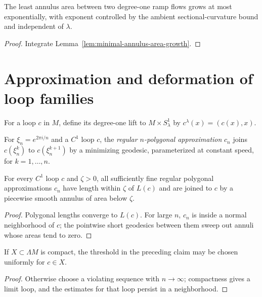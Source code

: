 \begin{corollary}
\label{cor:minimal-annulus-exponential-growth}

The least annulus area between two degree-one ramp flows grows at most
exponentially, with exponent controlled by the ambient sectional-curvature
bound and independent of $\lambda$.
\end{corollary}
\begin{proof}
\sketch Integrate Lemma~\ref{lem:minimal-annulus-area-growth}.
\end{proof}

\section{Approximation and deformation of loop families}

For a loop $c$ in $M$, define its degree-one lift to
$M\times S^1_\lambda$ by $c^\lambda(x)=(c(x),x)$.

\begin{definition}
\label{def:n-polygonal-approximation}
For $\xi_n=e^{2\pi i/n}$ and a $C^1$ loop $c$, the \emph{regular
$n$-polygonal approximation} $c_n$ joins
$c(\xi_n^k)$ to $c(\xi_n^{k+1})$ by a minimizing geodesic, parameterized at
constant speed, for $k=1,\ldots,n$.
\end{definition}

\begin{claim}
\label{claim:polygonal-approximation-properties}
\label{onec}
For every $C^1$ loop $c$ and $\zeta>0$, all sufficiently fine regular
polygonal approximations $c_n$ have length within $\zeta$ of $L(c)$ and are
joined to $c$ by a piecewise smooth annulus of area below $\zeta$.
\end{claim}
\begin{proof}
\sketch Polygonal lengths converge to $L(c)$. For large $n$, $c_n$ is inside a
normal neighborhood of $c$; the pointwise short geodesics between them sweep
out annuli whose areas tend to zero.
\end{proof}

\begin{claim}
\label{claim:polygonal-approximation-uniform}
\label{uniformc}

If $X\subset\Lambda M$ is compact, the threshold in the preceding claim may
be chosen uniformly for $c\in X$.
\end{claim}
\begin{proof}
\sketch Otherwise choose a violating sequence with $n\to\infty$; compactness gives a
limit loop, and the estimates for that loop persist in a neighborhood.
\end{proof}

